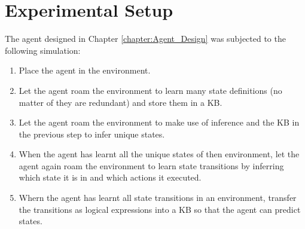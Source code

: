\section{Experimental Setup}
\label{sec:exp_setup}

The agent designed in Chapter \ref{chapter:Agent_Design} was subjected to the following simulation:
\begin{enumerate}
\item Place the agent in the environment.
\item Let the agent roam the environment to learn many state definitions (no matter of they are redundant) and store them in a KB.
\item Let the agent roam the environment to make use of inference and the KB in the previous step to infer unique states.
\item When the agent has learnt all the unique states of then environment, let the agent again roam the environment to learn state transitions by inferring which state it is in and which actions it executed.
\item Whern the agent has learnt all state transitions in an environment, transfer the transitions as logical expressions into a KB so that the agent can predict states.
 
\end{enumerate}














\newpage
